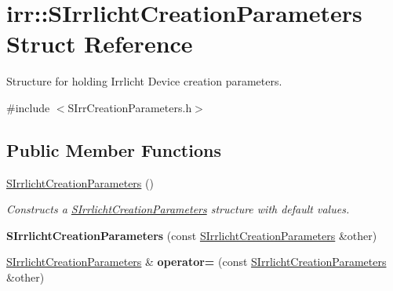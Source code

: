 \hypertarget{structirr_1_1SIrrlichtCreationParameters}{}\section{irr\+:\+:S\+Irrlicht\+Creation\+Parameters Struct Reference}
\label{structirr_1_1SIrrlichtCreationParameters}


Structure for holding Irrlicht Device creation parameters.  




{\ttfamily \#include $<$S\+Irr\+Creation\+Parameters.\+h$>$}

\subsection*{Public Member Functions}
\begin{DoxyCompactItemize}
\item 
\hyperlink{structirr_1_1SIrrlichtCreationParameters_a466e3b6d57ea40bdcacd6aae892845f1}{S\+Irrlicht\+Creation\+Parameters} ()\hypertarget{structirr_1_1SIrrlichtCreationParameters_a466e3b6d57ea40bdcacd6aae892845f1}{}\label{structirr_1_1SIrrlichtCreationParameters_a466e3b6d57ea40bdcacd6aae892845f1}

\begin{DoxyCompactList}\small\item\em Constructs a \hyperlink{structirr_1_1SIrrlichtCreationParameters}{S\+Irrlicht\+Creation\+Parameters} structure with default values. \end{DoxyCompactList}\item 
{\bfseries S\+Irrlicht\+Creation\+Parameters} (const \hyperlink{structirr_1_1SIrrlichtCreationParameters}{S\+Irrlicht\+Creation\+Parameters} \&other)\hypertarget{structirr_1_1SIrrlichtCreationParameters_a47655b6ce24945c17780f67915ff1338}{}\label{structirr_1_1SIrrlichtCreationParameters_a47655b6ce24945c17780f67915ff1338}

\item 
\hyperlink{structirr_1_1SIrrlichtCreationParameters}{S\+Irrlicht\+Creation\+Parameters} \& {\bfseries operator=} (const \hyperlink{structirr_1_1SIrrlichtCreationParameters}{S\+Irrlicht\+Creation\+Parameters} \&other)\hypertarget{structirr_1_1SIrrlichtCreationParameters_a224891bb4e94138d426611b48ca71750}{}\label{structirr_1_1SIrrlichtCreationParameters_a224891bb4e94138d426611b48ca71750}

\end{DoxyCompactItemize}
